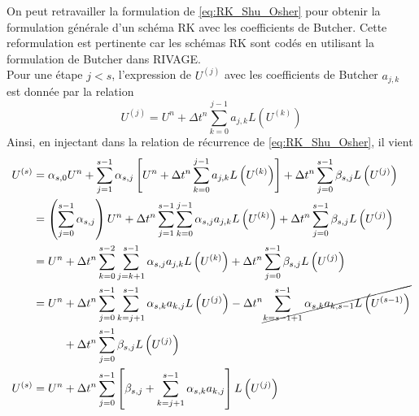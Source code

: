 \documentclass[11pt, a4paper, oneside]{report}
\begin{document}
\begin{samepage}
On peut retravailler la formulation de \eqref{eq:RK_Shu_Osher} pour obtenir la formulation générale d'un schéma RK avec les coefficients de Butcher. Cette reformulation est pertinente car les schémas RK sont codés en utilisant la formulation de Butcher dans RIVAGE. \\
Pour une étape $j < s$, l'expression de $U^{(j)}$ avec les coefficients de Butcher $a_{j, k}$ est donnée par la relation
\begin{equation} \label{eq:RK_Butcher}
    U^{(j)} = U^n + \Delta t^n \sum_{k = 0}^{j-1} a_{j, k} L \left( U^{(k)} \right)
\end{equation}
Ainsi, en injectant dans la relation de récurrence de \eqref{eq:RK_Shu_Osher}, il vient
\begin{equation} \label{eq:Developpement_Shu_Osher_Butcher}
    \begin{aligned}
        U^{(s)} & = \alpha_{s, 0} U^n + \sum_{j = 1}^{s-1}\alpha_{s, j} \left[ U^n + \Delta t^n \sum_{k = 0}^{j-1} a_{j, k} L \left( U^{(k)} \right) \right] + \Delta t^n \sum_{j = 0}^{s-1} \beta_{s, j} L \left( U^{(j)} \right) \\
        & = \left( \sum_{j = 0}^{s-1} \alpha_{s, j} \right) U^n + \Delta t^n \sum_{j = 1}^{s-1} \sum_{k = 0}^{j-1} \alpha_{s, j} a_{j, k} L \left( U^{(k)} \right) + \Delta t^n \sum_{j = 0}^{s-1} \beta_{s, j} L \left( U^{(j)} \right) \\
        & = U^n + \Delta t^n \sum_{k = 0}^{s-2} \sum_{j = k+1}^{s-1} \alpha_{s, j} a_{j, k} L \left( U^{(k)} \right) + \Delta t^n \sum_{j = 0}^{s-1} \beta_{s, j} L \left( U^{(j)} \right) \\
        & = U^n + \Delta t^n \sum_{j = 0}^{s-1} \sum_{k = j+1}^{s-1} \alpha_{s, k} a_{k, j} L \left( U^{(j)} \right) - \Delta t^n \cancel{\sum_{k = s-1+1}^{s-1} \alpha_{s, k} a_{k, s-1} L \left( U^{(s-1)} \right)} \\
        & \phantom{{}= U^n} + \Delta t^n \sum_{j = 0}^{s-1} \beta_{s, j} L \left( U^{(j)} \right) \\
        U^{(s)} & = U^n + \Delta t^n \sum_{j = 0}^{s-1} \left[ \beta_{s, j} + \sum_{k = j+1}^{s-1} \alpha_{s, k} a_{k, j} \right] L \left( U^{(j)} \right)
    \end{aligned}
\end{equation}
\end{samepage}
\end{document}

